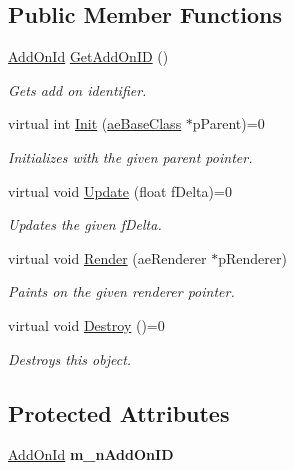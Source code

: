 \subsection*{Public Member Functions}
\begin{DoxyCompactItemize}
\item 
\hyperlink{_add_on_8h_a10abdd289149f0a510d47930d565b1ea}{Add\+On\+Id} \hyperlink{classae_add_on_a083d2b190df05e023fe65a70514a409f}{Get\+Add\+On\+ID} ()
\begin{DoxyCompactList}\small\item\em Gets add on identifier. \end{DoxyCompactList}\item 
virtual int \hyperlink{classae_add_on_a0730c1446e548031f9a4e98435a54675}{Init} (\hyperlink{classae_base_class}{ae\+Base\+Class} $\ast$p\+Parent)=0
\begin{DoxyCompactList}\small\item\em Initializes with the given parent pointer. \end{DoxyCompactList}\item 
virtual void \hyperlink{classae_add_on_a51caa4b8680206495ea671e71991e231}{Update} (float f\+Delta)=0
\begin{DoxyCompactList}\small\item\em Updates the given f\+Delta. \end{DoxyCompactList}\item 
virtual void \hyperlink{classae_add_on_ab6bed56009b9c92df8ae017a27587dc3}{Render} (ae\+Renderer $\ast$p\+Renderer)
\begin{DoxyCompactList}\small\item\em Paints on the given renderer pointer. \end{DoxyCompactList}\item 
virtual void \hyperlink{classae_add_on_a35cc5d72d19587868c9424603046b331}{Destroy} ()=0\hypertarget{classae_add_on_a35cc5d72d19587868c9424603046b331}{}\label{classae_add_on_a35cc5d72d19587868c9424603046b331}

\begin{DoxyCompactList}\small\item\em Destroys this object. \end{DoxyCompactList}\end{DoxyCompactItemize}
\subsection*{Protected Attributes}
\begin{DoxyCompactItemize}
\item 
\hyperlink{_add_on_8h_a10abdd289149f0a510d47930d565b1ea}{Add\+On\+Id} {\bfseries m\+\_\+n\+Add\+On\+ID}\hypertarget{classae_add_on_acbdd558468d6df44cb95b8581be8d11b}{}\label{classae_add_on_acbdd558468d6df44cb95b8581be8d11b}

\end{DoxyCompactItemize}


